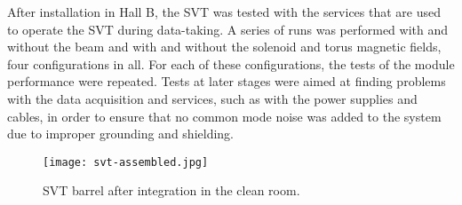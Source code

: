 After installation in Hall B, the SVT was tested with the services that are used to operate the SVT during data-taking. A series of runs was performed with and without the beam and with and without the solenoid and torus magnetic fields, four configurations in all. For each of these configurations, the tests of the module performance were repeated. Tests at later stages were aimed at finding problems with the data acquisition and services, such as with the power supplies and cables, in order to ensure that no common mode noise was added to the system due to improper grounding and shielding. 

\begin{figure}[h] 
\centering 
\texttt{[image: svt-assembled.jpg]}
\caption{SVT barrel after integration in the clean room.}
\label{fig:svt-assembled}
\end{figure}
